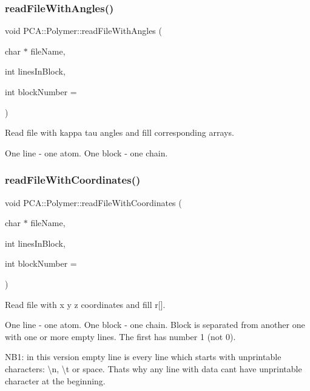 \subsubsection{\texorpdfstring{read\+File\+With\+Angles()}{readFileWithAngles()}}
{\footnotesize\ttfamily void P\+C\+A\+::\+Polymer\+::read\+File\+With\+Angles (\begin{DoxyParamCaption}\item[{char $\ast$}]{file\+Name,  }\item[{int}]{lines\+In\+Block,  }\item[{int}]{block\+Number = {} }\end{DoxyParamCaption})\hspace{0.3cm}{\ttfamily [protected]}}



Read file with kappa tau angles and fill corresponding arrays. 

One line -\/ one atom. One block -\/ one chain. \hypertarget{class_p_c_a_1_1_polymer_a777691bb321ef1da30a064757eb480c7}{}\label{class_p_c_a_1_1_polymer_a777691bb321ef1da30a064757eb480c7} 
\subsubsection{\texorpdfstring{read\+File\+With\+Coordinates()}{readFileWithCoordinates()}}
{\footnotesize\ttfamily void P\+C\+A\+::\+Polymer\+::read\+File\+With\+Coordinates (\begin{DoxyParamCaption}\item[{char $\ast$}]{file\+Name,  }\item[{int}]{lines\+In\+Block,  }\item[{int}]{block\+Number = {} }\end{DoxyParamCaption})\hspace{0.3cm}{\ttfamily [protected]}}



Read file with x y z coordinates and fill r\mbox{[}\mbox{]}. 

One line -\/ one atom. One block -\/ one chain. Block is separated from another one with one or more empty lines. The first has number 1 (not 0).

N\+B1\+: in this version empty line is every line which starts with unprintable characters\+: \textbackslash{}n, \textbackslash{}t or space. That\textquotesingle{}s why any line with data can\textquotesingle{}t have unprintable character at the beginning.

